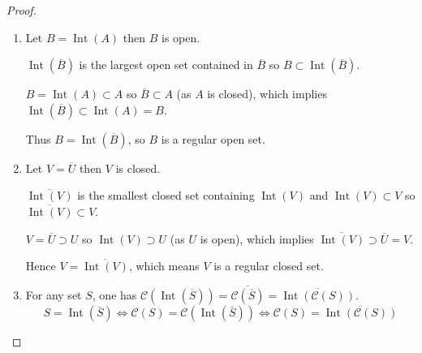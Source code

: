 \begin{proof}
	\begin{enumerate}[leftmargin=*,label={(\alph*)},itemsep=0pt]
		\item Let \( B = \operatorname{Int}(A) \) then \(B\) is open.

		      \( \operatorname{Int}(\overline{B}) \) is the largest open set contained in \( \overline{B} \) so \( B \subset \operatorname{Int}(\overline{B}) \).


		      \( B = \operatorname{Int}(A) \subset A \) so \( \overline{B} \subset A \) (as \(A\) is closed), which implies \( \operatorname{Int}(\overline{B}) \subset \operatorname{Int}(A) = B \).

		      Thus \( B = \operatorname{Int}(\overline{B}) \), so \( B \) is a regular open set.
		\item Let \( V = \overline{U} \) then \( V \) is closed.

		      \( \overline{\operatorname{Int}(V)} \) is the smallest closed set containing \( \operatorname{Int}(V) \) and \( \operatorname{Int}(V) \subset V \) so \( \overline{\operatorname{Int}(V)} \subset V \).

		      \( V = \overline{U} \supset U \) so \( \operatorname{Int}(V) \supset U \) (as \(U\) is open), which implies \( \overline{\operatorname{Int}(V)} \supset \overline{U} = V \).

		      Hence \( V = \overline{\operatorname{Int}(V)} \), which means \( V \) is a regular closed set.
		\item For any set \(S\), one has \( \mathscr{C}(\operatorname{Int}(\overline{S})) = \overline{\mathscr{C}(\overline{S})} = \overline{\operatorname{Int}(\mathscr{C}(S))} \).
		      \[
			      S = \operatorname{Int}(\overline{S}) \iff \mathscr{C}(S) = \mathscr{C}(\operatorname{Int}(\overline{S})) \iff \mathscr{C}(S) = \overline{\operatorname{Int}(\mathscr{C}(S))}
		      \]


\end{enumerate}
\end{proof}
